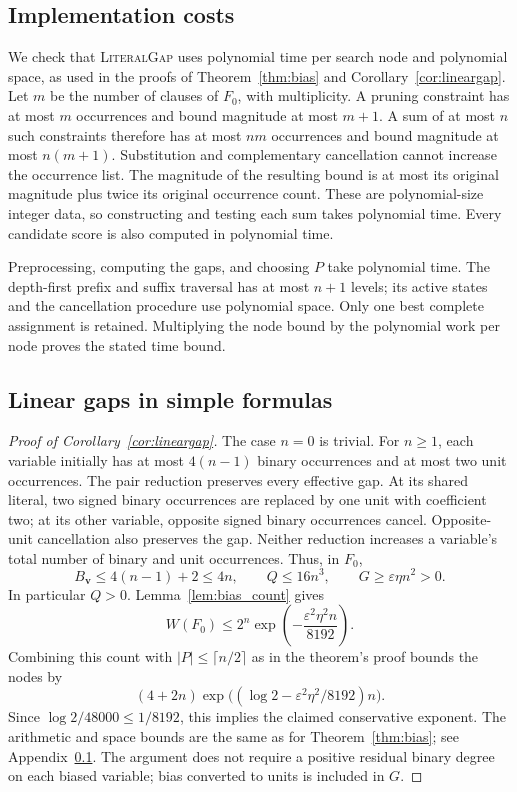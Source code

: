 \documentclass[11pt,a4paper]{article}
\theoremstyle{definition}
\theoremstyle{remark}
\begin{document}
\subsection{Implementation costs}\label{app:bias_implementation}

We check that \textnormal{\textsc{LiteralGap}} uses polynomial time per
search node and polynomial space, as used in the proofs of
Theorem~\ref{thm:bias} and Corollary~\ref{cor:lineargap}.
Let $m$ be the number
of clauses of $F_0$, with multiplicity. A pruning constraint has at most
$m$ occurrences and bound magnitude at most $m+1$. A sum of at most
$n$ such constraints therefore has at most $nm$ occurrences and bound
magnitude at most $n(m+1)$. Substitution and complementary cancellation
cannot increase the occurrence list. The magnitude of the resulting bound
is at most its original magnitude plus twice its original occurrence
count. These are polynomial-size integer data, so constructing and testing
each sum takes polynomial time. Every candidate score is also computed
in polynomial time.

Preprocessing, computing the gaps, and choosing $P$ take polynomial time.
The depth-first prefix and suffix traversal has at most $n+1$ levels;
its active states and the cancellation procedure use polynomial space.
Only one best complete assignment is retained. Multiplying the node bound
by the polynomial work per node proves the stated time bound.

\subsection{Linear gaps in simple formulas}\label{app:lineargap_proof}

\begin{proof}[Proof of Corollary~\ref{cor:lineargap}]
The case $n=0$ is trivial. For $n\ge1$, each variable initially has at
most $4(n-1)$ binary occurrences and at most two unit occurrences.
The pair reduction preserves every effective gap. At its shared literal,
two signed binary occurrences are replaced by one unit with coefficient
two; at its other variable, opposite signed binary occurrences cancel.
Opposite-unit cancellation also preserves the gap. Neither reduction
increases a variable's total number of binary and unit occurrences.
Thus, in $F_0$,
\[
 B_{\mathbf v}\le4(n-1)+2\le4n,\qquad Q\le16n^3,
 \qquad G\ge\varepsilon\eta n^2>0.
\]
In particular $Q>0$. Lemma~\ref{lem:bias_count} gives
\[
 W(F_0)\le2^n\exp\left(-\frac{\varepsilon^2\eta^2 n}{8192}\right).
\]
Combining this count with $|P|\le\lceil n/2\rceil$ as in the theorem's
proof bounds the nodes by
\[
 (4+2n)\exp\bigl((\log2-\varepsilon^2\eta^2/8192)n\bigr).
\]
Since $\log2/48000\le1/8192$, this implies the claimed conservative
exponent. The arithmetic and space bounds are the same as for
Theorem~\ref{thm:bias}; see Appendix~\ref{app:bias_implementation}. The
argument does not require a positive residual binary degree on each
biased variable; bias converted to units is included in $G$.
\end{proof}
\end{document}
